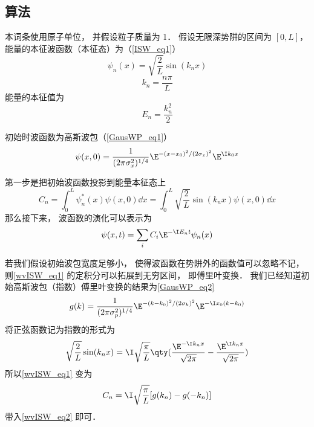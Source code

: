 \subsection{算法}

本词条使用原子单位， 并假设粒子质量为 1． 假设无限深势阱的区间为 $[0, L]$， 能量的本征波函数（本征态）为（\autoref{ISW_eq1}）
\begin{equation}
\psi _n(x) = \sqrt{\frac{2}{L}} \sin(k_n x)
\end{equation}
\begin{equation}
k_n = \frac{n\pi }{L}
\end{equation}
能量的本征值为
\begin{equation}
E_n = \frac{k_n^2}{2}
\end{equation}

初始时波函数为高斯波包（\autoref{GausWP_eq1}）
\begin{equation}
\psi (x,0) = \frac{1}{(2\pi \sigma _x ^2)^{1/4}} \E^{-(x - x_0)^2/(2\sigma _x)^2} \E^{\I k_0x}
\end{equation}

第一步是把初始波函数投影到能量本征态上
\begin{equation}\label{wvISW_eq1}
C_n = \int_0^L \psi _n^*(x) \psi (x,0) \dd{x}
= \int_0^L \sqrt{\frac{2}{L}} \sin(k_n x) \psi (x,0) \dd{x}
\end{equation}
那么接下来， 波函数的演化可以表示为
\begin{equation}\label{wvISW_eq2}
\psi (x,t) = \sum _i C_i \E^{-\I E_n t} \psi _n(x)
\end{equation}

若我们假设初始波包宽度足够小， 使得波函数在势阱外的函数值可以忽略不记， 则\autoref{wvISW_eq1} 的定积分可以拓展到无穷区间， 即傅里叶变换． 我们已经知道初始高斯波包（指数）傅里叶变换的结果为\autoref{GausWP_eq2}
\begin{equation}
g(k) = \frac{1}{(2\pi \sigma _p^2)^{1/4}} \E^{-(k - k_0)^2/(2\sigma _k)^2} \E^{-\I x_0(k - k_0)}
\end{equation}
将正弦函数记为指数的形式为
\begin{equation}
\sqrt{\frac{2}{L}} \sin(k_n x) = \I \sqrt{\frac{\pi }{L}} \qty(\frac{\E^{-\I k_n x}}{\sqrt{2\pi }} - \frac{\E^{\I k_n x}}{\sqrt{2\pi }})
\end{equation}
所以\autoref{wvISW_eq1} 变为
\begin{equation}
C_n = \I \sqrt{\frac{\pi }{L}} [g(k_n) - g(-k_n)]
\end{equation}
带入\autoref{wvISW_eq2} 即可．


